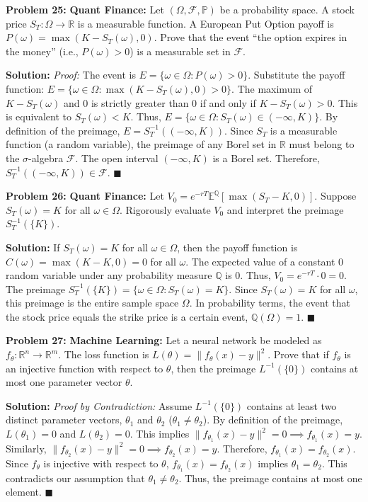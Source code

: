 \documentclass[11pt, letterpaper]{article}
\theoremstyle{definition}
\theoremstyle{remark}
\newcommand{\R}{\mathbb{R}}
\newcommand{\Q}{\mathbb{Q}}
\newcommand{\E}{\mathbb{E}}
\newcommand{\Prob}{\mathbb{P}}
\newcommand{\F}{\mathcal{F}}
\begin{document}
\vspace{1em}
\textbf{Problem 25:} \textbf{Quant Finance:} Let $(\Omega, \F, \Prob)$ be a probability space. A stock price $S_T: \Omega \to \R$ is a measurable function. A European Put Option payoff is $P(\omega) = \max(K - S_T(\omega), 0)$. Prove that the event ``the option expires in the money'' (i.e., $P(\omega) > 0$) is a measurable set in $\F$.

\textbf{Solution:}
\textit{Proof:} The event is $E = \{\omega \in \Omega : P(\omega) > 0\}$.
Substitute the payoff function: $E = \{\omega \in \Omega : \max(K - S_T(\omega), 0) > 0\}$.
The maximum of $K - S_T(\omega)$ and $0$ is strictly greater than $0$ if and only if $K - S_T(\omega) > 0$.
This is equivalent to $S_T(\omega) < K$.
Thus, $E = \{\omega \in \Omega : S_T(\omega) \in (-\infty, K)\}$.
By definition of the preimage, $E = S_T^{-1}((-\infty, K))$.
Since $S_T$ is a measurable function (a random variable), the preimage of any Borel set in $\R$ must belong to the $\sigma$-algebra $\F$. The open interval $(-\infty, K)$ is a Borel set. Therefore, $S_T^{-1}((-\infty, K)) \in \F$. \hfill $\blacksquare$

\vspace{1em}
\textbf{Problem 26:} \textbf{Quant Finance:} Let $V_0 = e^{-rT} \E^\Q[\max(S_T - K, 0)]$. Suppose $S_T(\omega) = K$ for all $\omega \in \Omega$. Rigorously evaluate $V_0$ and interpret the preimage $S_T^{-1}(\{K\})$.

\textbf{Solution:}
If $S_T(\omega) = K$ for all $\omega \in \Omega$, then the payoff function is $C(\omega) = \max(K - K, 0) = 0$ for all $\omega$.
The expected value of a constant $0$ random variable under any probability measure $\Q$ is $0$.
Thus, $V_0 = e^{-rT} \cdot 0 = 0$.
The preimage $S_T^{-1}(\{K\}) = \{\omega \in \Omega : S_T(\omega) = K\}$. Since $S_T(\omega) = K$ for all $\omega$, this preimage is the entire sample space $\Omega$. In probability terms, the event that the stock price equals the strike price is a certain event, $\Q(\Omega) = 1$. \hfill $\blacksquare$

\vspace{1em}
\textbf{Problem 27:} \textbf{Machine Learning:} Let a neural network be modeled as $f_\theta: \R^n \to \R^m$. The loss function is $L(\theta) = \|f_\theta(x) - y\|^2$. Prove that if $f_\theta$ is an injective function with respect to $\theta$, then the preimage $L^{-1}(\{0\})$ contains at most one parameter vector $\theta$.

\textbf{Solution:}
\textit{Proof by Contradiction:} Assume $L^{-1}(\{0\})$ contains at least two distinct parameter vectors, $\theta_1$ and $\theta_2$ ($\theta_1 \neq \theta_2$).
By definition of the preimage, $L(\theta_1) = 0$ and $L(\theta_2) = 0$.
This implies $\|f_{\theta_1}(x) - y\|^2 = 0 \implies f_{\theta_1}(x) = y$.
Similarly, $\|f_{\theta_2}(x) - y\|^2 = 0 \implies f_{\theta_2}(x) = y$.
Therefore, $f_{\theta_1}(x) = f_{\theta_2}(x)$.
Since $f_\theta$ is injective with respect to $\theta$, $f_{\theta_1}(x) = f_{\theta_2}(x)$ implies $\theta_1 = \theta_2$.
This contradicts our assumption that $\theta_1 \neq \theta_2$. Thus, the preimage contains at most one element. \hfill $\blacksquare$
\end{document}
